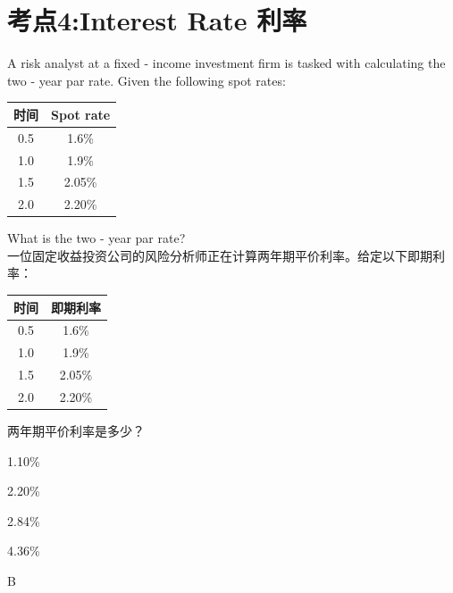 \documentclass{article}
\newcounter{question} %
\begin{document}
\section{考点4:Interest Rate 利率}
\setcounter{question}{0}
\begin{question}
    A risk analyst at a fixed - income investment firm is tasked with calculating the two - year par rate. Given the following spot rates:
    \begin{center}
    \begin{tabular}{|c|c|}
    \hline
    时间 & Spot rate \\
    \hline
    0.5 & 1.6\% \\
    \hline
    1.0 & 1.9\% \\
    \hline
    1.5 & 2.05\% \\
    \hline
    2.0 & 2.20\% \\
    \hline
    \end{tabular}
    \end{center}
    What is the two - year par rate?
    \\一位固定收益投资公司的风险分析师正在计算两年期平价利率。给定以下即期利率：
    \begin{center}
        \begin{tabular}{|c|c|}
        \hline
        时间 & 即期利率 \\
        \hline
        0.5 & 1.6\% \\
        \hline
        1.0 & 1.9\% \\
        \hline
        1.5 & 2.05\% \\
        \hline
        2.0 & 2.20\% \\
        \hline
        \end{tabular}
        \end{center}
        两年期平价利率是多少？
    \end{question}
    
    \begin{choices}
        \item 1.10\%
        \item 2.20\%
        \item 2.84\%
        \item 4.36\%
    \end{choices}
    
    \begin{correctanswer}
    B
    \end{correctanswer}
    
\end{document}

